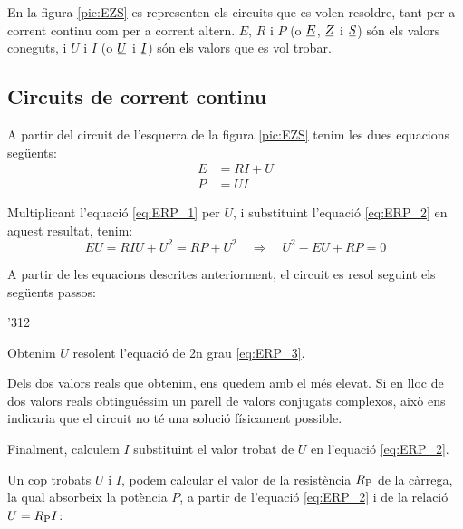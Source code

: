 En la figura \vref{pic:EZS} es representen els circuits que es volen
resoldre, tant per a corrent continu com per a corrent altern. $E$,
$R$ i $P$ (o $\cmplx{E}$, $\cmplx{Z}$ i $\cmplx{S}$) són els valors
coneguts, i $U$ i $I$ (o $\cmplx{U}$ i $\cmplx{I}$) són els valors
que es vol trobar.

\begin{center}
   
     \label{pic:EZS}
\end{center}

\subsection{Circuits de corrent continu}

A partir del circuit de l'esquerra de la figura \vref{pic:EZS} tenim les dues equacions següents:
\begin{align}
   E &= R I + U \label{eq:ERP_1} \\
   P &= U I     \label{eq:ERP_2}
\end{align}

Multiplicant l'equació \eqref{eq:ERP_1} per $U$, i substituint l'equació \eqref{eq:ERP_2} en aquest resultat, tenim:
\begin{equation}
   E U = R I U + U^2 = R P + U^2 \quad \Rightarrow \quad U^2 - E U + R P = 0 \label{eq:ERP_3}
\end{equation}

A partir de les equacions descrites anteriorment, el circuit es resol seguint els següents passos:
\begin{dingautolist}{'312}
   \item Obtenim $U$ resolent l'equació de 2n grau \eqref{eq:ERP_3}.
   \item Dels dos valors reals que obtenim, ens quedem amb el més elevat. Si en lloc de dos valors reals obtinguéssim
   un parell de valors conjugats complexos, això ens indicaria que el circuit no té una solució físicament possible.
   \item Finalment, calculem $I$ substituint el valor trobat de $U$ en l'equació \eqref{eq:ERP_2}.
\end{dingautolist}

Un cop trobats $U$ i $I$, podem calcular el valor de la resistència
$R_\mathrm{P}$ de la càrrega, la qual absorbeix la potència $P$, a
partir de l'equació \eqref{eq:ERP_2} i de la relació $U =R_\mathrm{P}
I$:

